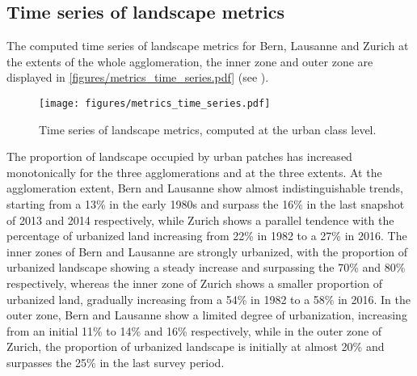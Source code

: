 \subsection*{Time series of landscape metrics}

The computed time series of landscape metrics for Bern, Lausanne and Zurich at the extents of the whole agglomeration, the inner zone and outer zone are displayed in \autoref{figures/metrics_time_series.pdf} (see ).

\begin{figure}[!ht]
  \begin{adjustwidth}{0cm}{-.3\textwidth}
    \centering
    \texttt{[image: figures/metrics\_time\_series.pdf]}
    
    \caption[Time series of landscape metrics]{\label{figures/metrics_time_series.pdf}Time series of landscape metrics, computed at the urban class level.}
  \end{adjustwidth}
\end{figure}

The proportion of landscape occupied by urban patches has increased monotonically for the three agglomerations and at the three extents.
At the agglomeration extent, Bern and Lausanne show almost indistinguishable trends, starting from a 13\% in the early 1980s and surpass the 16\% in the last snapshot of 2013 and 2014 respectively, while Zurich shows a parallel tendence with the percentage of urbanized land increasing from 22\% in 1982 to a 27\% in 2016.
The inner zones of Bern and Lausanne are strongly urbanized, with the proportion of urbanized landscape showing a steady increase and surpassing the 70\% and 80\% respectively, whereas the inner zone of Zurich shows a smaller proportion of urbanized land, gradually increasing from a 54\% in 1982 to a 58\% in 2016.
In the outer zone, Bern and Lausanne show a limited degree of urbanization, increasing from an initial 11\% to 14\% and 16\% respectively, while in the outer zone of Zurich, the proportion of urbanized landscape is initially at almost 20\% and surpasses the 25\% in the last survey period.

